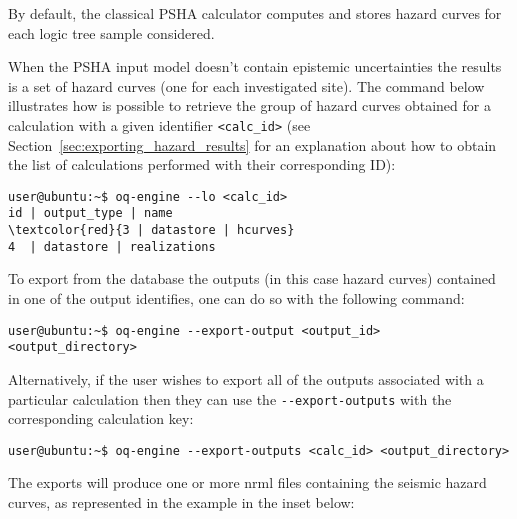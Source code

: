 By default, the classical PSHA calculator computes and stores hazard curves
for each logic tree sample considered.

When the PSHA input model doesn't contain epistemic uncertainties the results
is a set of hazard curves (one for each investigated site). The command below
illustrates how is possible to retrieve the group of hazard curves obtained
for a calculation with a given identifier \texttt{<calc\_id>} (see
Section~\ref{sec:exporting_hazard_results} for an explanation about how to
obtain the list of calculations performed with their corresponding ID):

\begin{Verbatim}[frame=single, commandchars=\\\{\}, fontsize=\small]
user@ubuntu:~$ oq-engine --lo <calc_id>
id | output_type | name
\textcolor{red}{3 | datastore | hcurves}
4  | datastore | realizations
\end{Verbatim}

%
%
%


To export from the database the outputs (in this case hazard curves)  contained in one of the output identifies, one can do so with the following command:

\begin{Verbatim}[frame=single, commandchars=\\\{\}, fontsize=\small]
user@ubuntu:~$ oq-engine --export-output <output_id> <output_directory>
\end{Verbatim}

Alternatively, if the user wishes to export all of the outputs associated with a particular calculation then they can use the \texttt{-{}-export-outputs} with the corresponding calculation key:

\begin{Verbatim}[frame=single, commandchars=\\\{\}, fontsize=\small]
user@ubuntu:~$ oq-engine --export-outputs <calc_id> <output_directory>
\end{Verbatim}

The exports will produce one or more nrml files containing the seismic hazard curves, as represented in the example in the inset
below:

